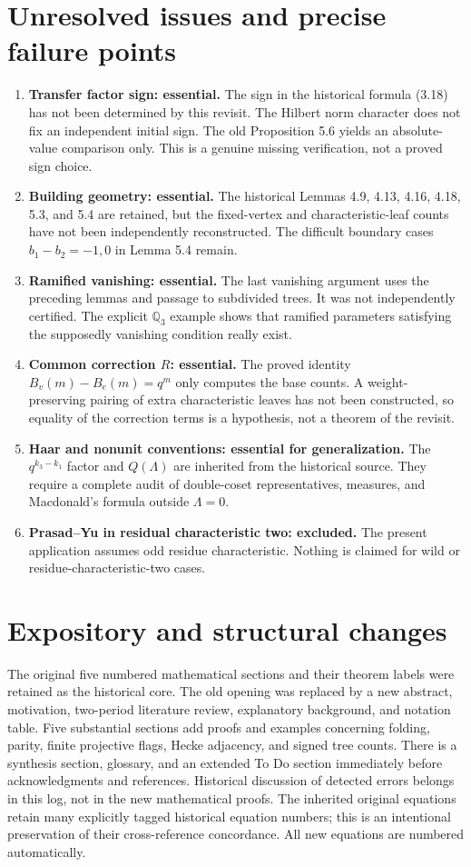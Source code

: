 \documentclass[12pt,letterpaper]{amsart}
\begin{document}
\section{Unresolved issues and precise failure points}
\begin{enumerate}
\item \textbf{Transfer factor sign: essential.} The sign in the
historical formula (3.18) has not been determined by this revisit.
The Hilbert norm character does not fix an independent initial sign.
The old Proposition 5.6 yields an absolute-value comparison only.
This is a genuine missing verification, not a proved sign choice.
\item \textbf{Building geometry: essential.} The historical Lemmas
4.9, 4.13, 4.16, 4.18, 5.3, and 5.4 are retained, but the fixed-vertex
and characteristic-leaf counts have not been independently reconstructed.
The difficult boundary cases $b_1-b_2=-1,0$ in Lemma 5.4 remain.
\item \textbf{Ramified vanishing: essential.} The last vanishing
argument uses the preceding lemmas and passage to subdivided trees.
It was not independently certified. The explicit $\mathbb Q_3$
example shows that ramified parameters satisfying the supposedly
vanishing condition really exist.
\item \textbf{Common correction $R$: essential.} The proved identity
$B_v(m)-B_e(m)=q^m$ only computes the base counts. A
weight-preserving pairing of extra characteristic leaves has not
been constructed, so equality of the correction terms is a hypothesis,
not a theorem of the revisit.
\item \textbf{Haar and nonunit conventions: essential for generalization.}
The $q^{k_3-k_1}$ factor and $Q(\Lambda)$ are inherited from the
historical source. They require a complete audit of double-coset
representatives, measures, and Macdonald's formula outside $\Lambda=0$.
\item \textbf{Prasad--Yu in residual characteristic two: excluded.}
The present application assumes odd residue characteristic.
Nothing is claimed for wild or residue-characteristic-two cases.
\end{enumerate}

\section{Expository and structural changes}
The original five numbered mathematical sections and their theorem
labels were retained as the historical core. The old opening
was replaced by a new abstract, motivation, two-period literature
review, explanatory background, and notation table. Five substantial
sections add proofs and examples concerning folding, parity,
finite projective flags, Hecke adjacency, and signed tree counts.
There is a synthesis section, glossary, and an extended To Do section
immediately before acknowledgments and references.
Historical discussion of detected errors belongs in this log,
not in the new mathematical proofs. The inherited original equations
retain many explicitly tagged historical equation numbers; this is
an intentional preservation of their cross-reference concordance.
All new equations are numbered automatically.
\end{document}
